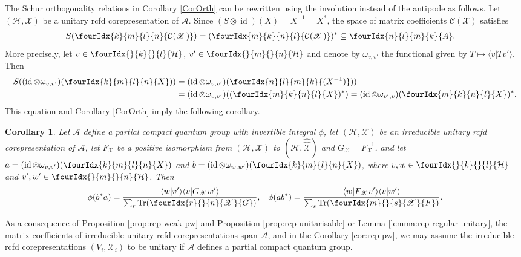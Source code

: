 \documentclass[10pt]{article}
\DeclareMathOperator{\id}{id}
\newcommand{\dualco}[1]{\hat{#1}}
\newcommand{\Hsp}{\mathcal{H}}
\newcommand{\Tr}{\mathrm{Tr}}
\newcommand{\Gr}[5]{\fourIdx{#2}{#4}{#3}{#5}{#1}}%
\newcommand{\Gru}[3]{\Gr{#1}{}{}{#2}{#3}}
\newtheorem{Cor}[Theorem]{Corollary}
\theoremstyle{definition}
\numberwithin{equation}{section}
\begin{document}
The Schur orthogonality relations in Corollary \ref{CorOrth} can be
rewritten using the involution instead of the antipode as follows.
Let $(\Hsp,\mathscr{X})$ be a unitary rcfd corepresentation of
$\mathscr{A}$. Since $(S\otimes \id)(X)=X^{-1}=X^{*}$, the space of
matrix coefficients $\mathcal{C}(\mathscr{X})$ satisfies
\begin{align} \label{eq:rep-unitary-matrix-coefficients}
  S(\Gr{\mathcal{C}(\mathscr{X})}{k}{l}{m}{n}) &=
  (\Gr{\mathcal{C}(\mathscr{X})}{m}{n}{k}{l})^{*} \subseteq \Gr{A}{n}{m}{l}{k}.
\end{align}
More precisely, let $v \in \Gru{\Hsp}{k}{l}$, $v' \in \Gru{\Hsp}{m}{n}$
and denote by $\omega_{v,v'}$ the functional
given by $T \mapsto \langle v|Tv'\rangle$. Then
\begin{align*}
  S((\id \otimes \omega_{v,v'})(\Gr{X}{k}{l}{m}{n})) &=
  (\id \otimes \omega_{v,v'}) (\Gr{(X^{-1})}{n}{m}{l}{k})) \\ & =
  (\id \otimes \omega_{v,v'})( (\Gr{X}{m}{n}{k}{l})^{*}) =
  (\id \otimes \omega_{v',v})(\Gr{X}{m}{n}{k}{l})^{*}.
\end{align*}
This equation and Corollary \ref{CorOrth} imply the following corollary.
\begin{Cor}\label{cor:rep-unitary-schur-orthogonality}
  Let $\mathscr{A}$ define a partial compact quantum group with
  invertible integral $\phi$, let $(\Hsp,\mathscr{X})$ be an irreducible
  unitary rcfd corepresentation of $\mathscr{A}$, let $F_{\mathscr{X}}$ be a positive
  isomorphism from $(\Hsp,\mathscr{X})$ to
  $(\Hsp,\dualco{\dualco{\mathscr{X}}})$ and
  $G_{\mathscr{X}}=F^{-1}_{{\mathscr{X}}}$, and let $a=(\id \otimes
  \omega_{v,v'})(\Gr{X}{k}{l}{m}{n})$ and $b=(\id \otimes
  \omega_{w,w'})(\Gr{X}{k}{l}{m}{n})$, where $v,w \in
  \Gru{\Hsp}{k}{l}$ and $v',w' \in \Gru{\Hsp}{m}{n}$.  Then
\begin{align*}
  \phi(b^{*}a) &= \frac{\langle w|v'\rangle\langle v|G_{\mathscr{X}}w'\rangle}{\sum_{r}
    \Tr(\Gr{G}{r}{n}{}{\mathscr{X}})}, & \phi(ab^{*}) = \frac{\langle
    w|F_{\mathscr{X}}v'\rangle \langle v|w'\rangle}{\sum_{s}
    \Tr(\Gr{F}{m}{s}{}{\mathscr{X}})}.
\end{align*}
\end{Cor}
As a consequence of Proposition \ref{prop:rep-weak-pw} and Proposition
\ref{prop:rep-unitarisable} or Lemma \ref{lemma:rep-regular-unitary},
the matrix coefficients of irreducible unitary rcfd corepresentations
span $\mathscr{A}$, and in the Corollary \ref{cor:rep-pw}, we may
assume the irreducible rcfd corepresentations
$(V_{i},\mathscr{X}_{i})$ to be unitary if $\mathscr{A}$
defines a partial compact quantum group.
\end{document}
